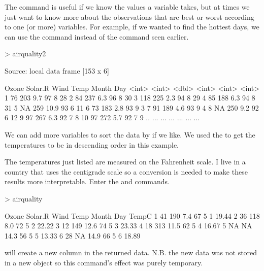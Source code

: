 The  command is useful if we know the values a variable takes, but at times we just want to know more about the observations that are best or worst according to one (or more) variables. For example, if we wanted to find the hottest days, we can use the  command instead of the  command seen earlier. 
\begin{Schunk}
\begin{Sinput}
> airquality2 %>% arrange(desc(Temp)) 
\end{Sinput}
\begin{Soutput}
Source: local data frame [153 x 6]

   Ozone Solar.R  Wind  Temp Month   Day
   <int>   <int> <dbl> <int> <int> <int>
1     76     203   9.7    97     8    28
2     84     237   6.3    96     8    30
3    118     225   2.3    94     8    29
4     85     188   6.3    94     8    31
5     NA     259  10.9    93     6    11
6     73     183   2.8    93     9     3
7     91     189   4.6    93     9     4
8     NA     250   9.2    92     6    12
9     97     267   6.3    92     7     8
10    97     272   5.7    92     7     9
..   ...     ...   ...   ...   ...   ...
\end{Soutput}
\end{Schunk}
We can add more variables to sort the data by if we like. We used the  to get the temperatures to be in descending order in this example. 
 
The temperatures just listed are measured on the Fahrenheit scale. I live in a country that uses the centigrade scale so a conversion is needed to make these results more interpretable. Enter the  and  
 commands.  
 
\begin{Schunk}
\begin{Sinput}
> airquality %>% mutate(TempC = (Temp - 32) * 5 / 9) %>% head() 
\end{Sinput}
\begin{Soutput}
  Ozone Solar.R Wind Temp Month Day TempC
1    41     190  7.4   67     5   1 19.44
2    36     118  8.0   72     5   2 22.22
3    12     149 12.6   74     5   3 23.33
4    18     313 11.5   62     5   4 16.67
5    NA      NA 14.3   56     5   5 13.33
6    28      NA 14.9   66     5   6 18.89
\end{Soutput}
\end{Schunk}
will create a new column in the returned data. N.B. the new data was not stored in a new object so this command's effect was purely temporary. 
 
